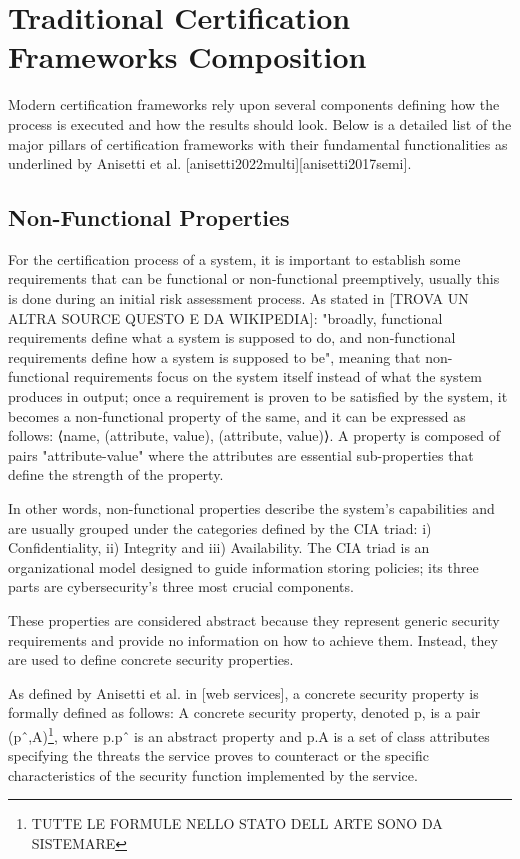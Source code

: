 

\section{Traditional Certification Frameworks Composition}
Modern certification frameworks rely upon several components defining how the process is executed and how the results should look. Below is a detailed list of the major pillars of certification frameworks with their fundamental functionalities as underlined by Anisetti et al. [anisetti2022multi][anisetti2017semi].

\subsection{Non-Functional Properties}
For the certification process of a system, it is important to establish some requirements that can be functional or non-functional preemptively, usually this is done during an initial risk assessment process. As stated in [TROVA UN ALTRA SOURCE QUESTO E DA WIKIPEDIA]: "broadly, functional requirements define what a system is supposed to do, and non-functional requirements define how a system is supposed to be", meaning that non-functional requirements focus on the system itself instead of what the system produces in output; once a requirement is proven to be satisfied by the system, it becomes a non-functional property of the same, and it can be expressed as follows: ⟨name, {(attribute, value), (attribute, value)}⟩. A property is composed of pairs "attribute-value" where the attributes are essential sub-properties that define the strength of the property.

In other words, non-functional properties describe the system's capabilities and are usually grouped under the categories defined by the CIA triad: i) Confidentiality, ii) Integrity and iii) Availability. The CIA triad is an organizational model designed to guide information storing policies; its three parts are cybersecurity's three most crucial components.

These properties are considered abstract because they represent generic security requirements and provide no information on how to achieve them. Instead, they are used to define concrete security properties. 

As defined by Anisetti et al. in [web services], a concrete security property is formally defined as follows:
A concrete security property, denoted p, is a pair (pˆ,A)\footnote{TUTTE LE FORMULE NELLO STATO DELL ARTE SONO DA SISTEMARE}, where p.pˆ is an abstract property and p.A is a set of class attributes specifying the threats the service proves to counteract or the specific characteristics of the security function implemented by the service.

